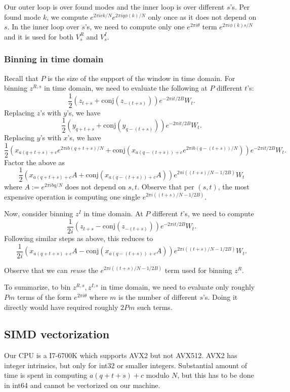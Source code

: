 \documentclass[10pt]{article}
\begin{document}
Our outer loop is over found modes and the inner loop is over different $s$'s. Per found mode $k$, we compute $e^{2\pi i ck/N} e^{2\pi i q \phi(k)/N}$ only once as it does not depend on $s$. In the inner loop over $s$'s, we need to compute only one $e^{2\pi i \theta}$ term $e^{2\pi i \phi(k)s/N}$ and it is used for both $V^R_s$ and $V^I_s$.


\subsubsection{Binning in time domain}
Recall that $P$ is the size of the support of the window in time domain. For binning $z^{R,s}$ in time domain, we need to evaluate the following at $P$ different $t$'s:
$$\frac{1}{2} ( z_{t+s} + \text{conj}(z_{-(t+s)})) e^{-2\pi i t/2B} W_t.$$
Replacing $z$'s with $y$'s, we have
$$\frac{1}{2}(y_{q+t+s} + \text{conj}(y_{q-(t+s)})) e^{-2\pi i t/2B}W_t.$$
Replacing $y$'s with $x$'s, we have
$$\frac{1}{2}\left(x_{a(q+t+s)+c}e^{2\pi i b(q+t+s)/N} + \text{conj}(x_{a(q-(t+s))+c} e^{2\pi i b(q-(t+s))/N})\right) e^{-2\pi i t/2B}W_t.$$
Factor the above as
$$\frac{1}{2} \left( x_{a(q+t+s)+c} A + \text{conj}(x_{a(q-(t+s))+c} A)\right)e^{2\pi i ((t+s)/N - 1/2B)} W_t $$
where $A:= e^{2\pi i bq/N}$ does not depend on $s, t$. Observe that per $(s, t)$, the most expensive operation is computing one single $e^{2\pi i ((t+s)/N - 1/2B)}$.

Now, consider binning $z^I$ in time domain. At $P$ different $t$'s, we need to compute
$$\frac{1}{2i} ( z_{t+s} - \text{conj}(z_{-(t+s)})) e^{-2\pi i t/2B} W_t.$$
Following similar steps as above, this reduces to
$$\frac{1}{2i} \left( x_{a(q+t+s)+c} A - \text{conj}(x_{a(q-(t+s))+c} A)\right)e^{2\pi i ((t+s)/N - 1/2B)} W_t.$$

Observe that we can \emph{reuse} the $e^{2\pi i ((t+s)/N - 1/2B)}$ term used for binning $z^R$.

To summarize, to bin $z^{R,s}, z^{I,s}$ in time domain, we need to evaluate only roughly $P m$ terms of the form $e^{2\pi i \theta}$ where $m$ is the number of different $s$'s. Doing it directly would have required roughly $2P m$ such terms.

\subsection{SIMD vectorization}

Our CPU is a I7-6700K which supports AVX2 but not AVX512. AVX2 has integer intrinsics, but only for int32 or smaller integers. Substantial amount of time is spent in computing $a(q+t+s)+c$ modulo $N$, but this has to be done in int64 and cannot be vectorized on our machine.
\end{document}

